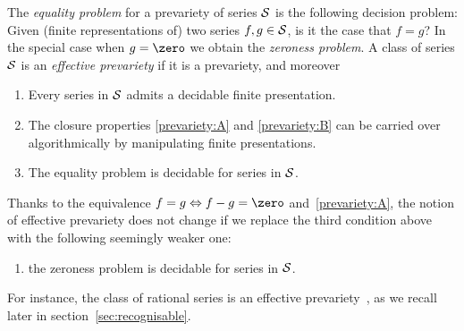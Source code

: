 %
The \emph{equality problem} for a prevariety of series $\mathcal S$ is the following decision problem:
Given (finite representations of) two series $f, g \in \mathcal S$, is it the case that $f = g$?
%
In the special case when $g = \zero$ we obtain the \emph{zeroness problem}.
%
A class of series $\mathcal S$ is an \emph{effective prevariety} if it is a prevariety,
and moreover
%
\begin{enumerate}
    \item Every series in $\mathcal S$ admits a decidable finite presentation.
    \item The closure properties \cref{prevariety:A} and \cref{prevariety:B} %
    can be carried over algorithmically by manipulating finite presentations.
    \item The equality problem is decidable for series in $\mathcal S$.
\end{enumerate}
%
%
\noindent
%
Thanks to the equivalence $f = g \iff f - g = \zero$ and~\cref{prevariety:A},
the notion of effective prevariety does not change if we replace the third condition above
with the following seemingly weaker one:
%
\begin{enumerate}
    \item[3')] the zeroness problem is decidable for series in $\mathcal S$.
\end{enumerate}
%
\noindent
For instance, the class of rational series is an effective prevariety~\cite[Sec.~III.2.b]{Reutenauer_1980},
as we recall later in section~\cref{sec:recognisable}.
